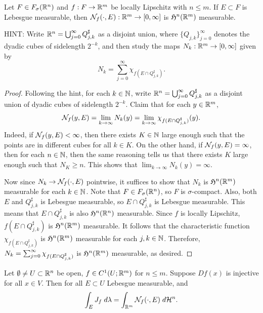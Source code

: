 \documentclass[a4paper]{article}
\begin{document}
\begin{thm}
Let $F \in F_\sigma(\mathbb{R}^n)$ and $f: F \to \mathbb{R}^m$ be locally
Lipschitz with $n \leq m$. If $E \subset F$ is Lebesgue
measurable, then $\mathcal{N}_f(\cdot, E) : \mathbb{R}^m \to [0, \infty]$
is $\mathfrak{H}^n(\mathbb{R}^m)$ measurable.
\end{thm}

HINT: Write $\mathbb{R}^n = \bigcup_{j=0}^\infty 
Q_{j,k}^\sharp$ as a disjoint union, where 
$\{Q_{j,k}\}_{j=0}^\infty$ denotes the dyadic cubes of 
sidelength $2^{-k}$, and then study the maps $N_k : \mathbb{R}^m 
\to [0,\infty]$ given by 
\[
N_k = \sum_{j=0}^\infty \chi_{f(E \cap Q_{j,k}^\sharp)}.
\]

\begin{proof}
Following the hint, for each $k \in \mathbb{N}$, write 
$\mathbb{R}^n = \bigcup_{j=0}^\infty Q_{j, k}^\sharp$
as a disjoint union of dyadic cubes of sidelength $2^{-k}$.
Claim that for each $y \in \mathbb{R}^m$, 
\[
\mathcal{N}_f (y, E) = \lim_{k \to \infty} N_k(y)
= \lim_{k \to \infty} \chi_{f(E \cap Q_{j, k}^\sharp)}(y).
\]
Indeed, if $\mathcal{N}_f(y, E) < \infty$, then there exists 
$K \in \mathbb{N}$ large enough such that the points are in 
different cubes for all $k \in K$. On the other hand, 
if $\mathcal{N}_f(y, E) = \infty$, then for each $n \in \mathbb{N}$, 
then the same reasoning tells us that 
there exists $K$ large enough such that $N_K \geq n$. 
This shows that $\lim_{k \to \infty} N_k(y) = \infty$.

Now since $N_k \to \mathcal{N}_f(\cdot, E)$ pointwise, it suffices 
to show that $N_k$ is $\mathfrak{H}^n(\mathbb{R}^m)$ measurable 
for each $k \in \mathbb{N}$. Note that $F \in F_\sigma(\mathbb{R}^n)$, so 
$F$ is $\sigma$-compact. Also, both $E$ 
and $Q_{j, k}^\sharp$ is Lebesgue measurable, so 
$E \cap Q_{j, k}^\sharp$ is Lebesgue measurable. 
This means that $E \cap Q_{j, k}^\sharp$ is also 
$\mathfrak{H}^n(\mathbb{R}^n)$ measurable. Since $f$ is locally Lipschitz, 
$f(E \cap Q_{j, k}^\sharp)$ is $\mathfrak{H}^n(\mathbb{R}^m)$ measurable. It
follows that the characteristic function 
$\chi_{f(E \cap Q_{j, k}^\sharp)}$ is $\mathfrak{H}^n 
(\mathbb{R}^m)$ measurable for each $j, k \in \mathbb{N}$. Therefore, 
$N_k = \sum_{j=0}^\infty \chi_{f(E \cap Q_{j, k}^\sharp)}$ is 
$\mathfrak{H}^n(\mathbb{R}^m)$ measurable, as desired.
\end{proof}

\begin{lemma}
Let $\emptyset \neq U \subset \mathbb{R}^n$ be open, $f \in C^1
(U ; \mathbb{R}^m)$ for $n \leq m$. Suppose $Df(x)$ is injective
for all $x \in V$. Then for all $E \subset U$ Lebesgue
measurable, and
\[
\int_E J_f \; d \lambda = \int_{\mathbb{R}^m} \mathcal{N}_f (\cdot, E) \; d \mathcal{H}^n.
\]
\end{lemma}
\end{document}
